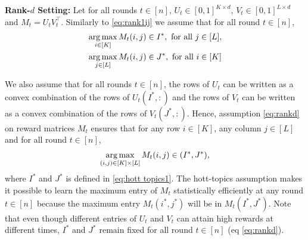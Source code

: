 \textbf{Rank-$d$ Setting:} Let for all rounds $t\in[n]$, $U_t \in [0,1]^{K\times d}$, $V_t \in [0,1]^{L\times d}$ and $M_t = U_t V_t^{\intercal}$. Similarly to \eqref{eq:rank1ij} we assume that for all round $t\in [n]$,
\begin{align}
& \mathop{\rm arg\,max}_{i\in[K]}M_{t}(i,j) \in I^\ast, \text{ for all $j \in [L]$} , \nonumber\\
& \mathop{\rm arg\,max}_{j\in[L]}M_{t}(i,j)\in J^\ast , \text{ for all $i \in [K]$}\label{eq:rankd}
\end{align}


We also assume that for all rounds $t\in [n]$, the rows of $U_t$ can be written as a convex combination of the rows of $U_t(I^\ast, :)$ and the rows of $V_t$ can be written as a convex combination of the rows of $V_t(J^\ast, :)$. Hence, assumption \eqref{eq:rankd} on reward matrices $M_t$ ensures that for any row $i \in [K]$, any column $j \in [L]$  and for all round $t \in [n]$,
\begin{align}
  \mathop{\rm arg\,max}_{(i, j) \in [K] \times [L]} M_t(i, j) \in (I^\ast, J^\ast) \label{eq:rewardProp},
\end{align}
where $I^\ast$ and $J^\ast$ is defined in \eqref{eq:hott topics1}. The hott-topics assumption makes it possible to learn the maximum entry of $M_t$ statistically efficiently at any round $t\in[n]$ because the maximum entry $M_t(i^*,j^*)$ will be in $M_t(I^*,J^*)$. Note that even though different entries of $U_t$ and $V_t$ can attain high rewards at different times, $I^*$ and $J^*$ remain fixed for all round $t\in[n]$ (eq \ref{eq:rankd}). 
